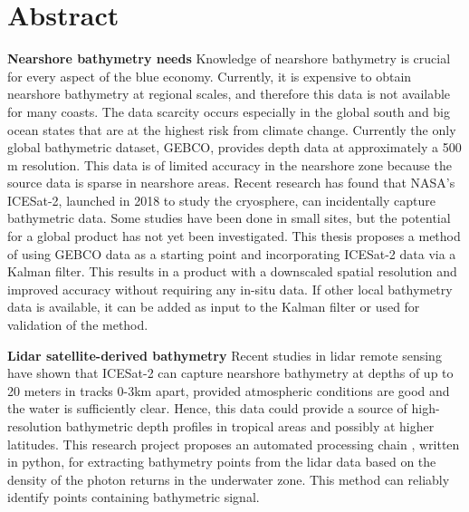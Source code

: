 \chapter*{Abstract}

\noindent\textbf{Nearshore bathymetry needs} Knowledge of nearshore bathymetry is crucial for every aspect of the blue economy. Currently, it is expensive to obtain nearshore bathymetry at regional scales, and therefore this data is not available for many coasts. The data scarcity occurs especially in the global south and big ocean states that are at the highest risk from climate change. Currently the only global bathymetric dataset, GEBCO, provides depth data at approximately a 500 m resolution. This data is of limited accuracy in the nearshore zone because the source data is sparse in nearshore areas. Recent research has found that NASA's ICESat-2, launched in 2018 to study the cryosphere, can incidentally capture bathymetric data. Some studies have been done in small sites, but the potential for a global product has not yet been investigated. This thesis proposes a method of using GEBCO data as a starting point and incorporating ICESat-2 data via a Kalman filter. This results in a product with a downscaled spatial resolution and improved accuracy without requiring any in-situ data. If other local bathymetry data is available, it can be added as input to the Kalman filter or used for validation of the method. 


\noindent\textbf{Lidar satellite-derived bathymetry} Recent studies in lidar remote sensing have shown that ICESat-2 can capture nearshore bathymetry at depths of up to 20 meters in tracks 0-3km apart, provided atmospheric conditions are good and the water is sufficiently clear. Hence, this data could provide a source of high-resolution bathymetric depth profiles in tropical areas and possibly at higher latitudes. This research project proposes an automated processing chain , written in python, for extracting bathymetry points from the lidar data based on the density of the photon returns in the underwater zone. This method can reliably identify points containing bathymetric signal. 


